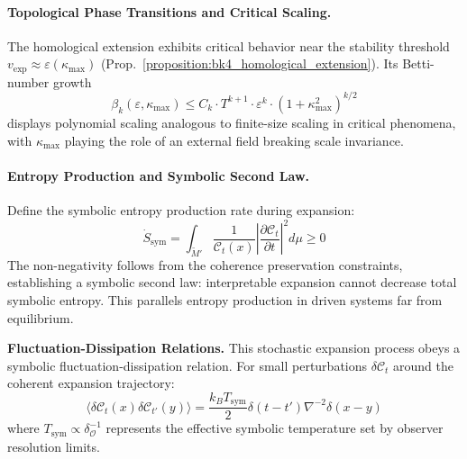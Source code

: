 \begin{demonstratio}
\paragraph{Topological Phase Transitions and Critical Scaling.}
The homological extension exhibits critical behavior near the stability
threshold $v_{\text{exp}} \approx \varepsilon(\kappa_{\max})$
(Prop.~\ref{proposition:bk4_homological_extension}).
Its Betti-number growth
\begin{equation}
\beta_k(\varepsilon,\kappa_{\max}) \leq C_k \cdot T^{k+1} \cdot \varepsilon^k \cdot (1+\kappa_{\max}^2)^{k/2}
\end{equation}
displays polynomial scaling analogous to finite-size scaling in critical phenomena, with $\kappa_{\max}$ playing the role of an external field breaking scale invariance.

\paragraph{Entropy Production and Symbolic Second Law.}
Define the symbolic entropy production rate during expansion:
\begin{equation}
\dot{S}_{\text{sym}} = \int_{\widetilde{M}'} \frac{1}{\mathcal{C}_t(x)} \left| \frac{\partial \mathcal{C}_t}{\partial t} \right|^2 d\mu \geq 0
\end{equation}
The non-negativity follows from the coherence preservation constraints, establishing a symbolic second law: interpretable expansion cannot decrease total symbolic entropy. This parallels entropy production in driven systems far from equilibrium.

\textbf{Fluctuation-Dissipation Relations.}
This stochastic expansion process obeys a symbolic
fluctuation-dissipation relation.
For small perturbations $\delta \mathcal{C}_t$ around the coherent expansion
trajectory:
\begin{equation}
\langle \delta \mathcal{C}_t(x) \delta \mathcal{C}_{t'}(y) \rangle = \frac{k_B T_{\text{sym}}}{2} \delta(t-t') \nabla^{-2} \delta(x-y)
\end{equation}
where $T_{\text{sym}} \propto \delta_{\mathcal{O}}^{-1}$ represents the effective symbolic temperature set by observer resolution limits.


\end{demonstratio}
